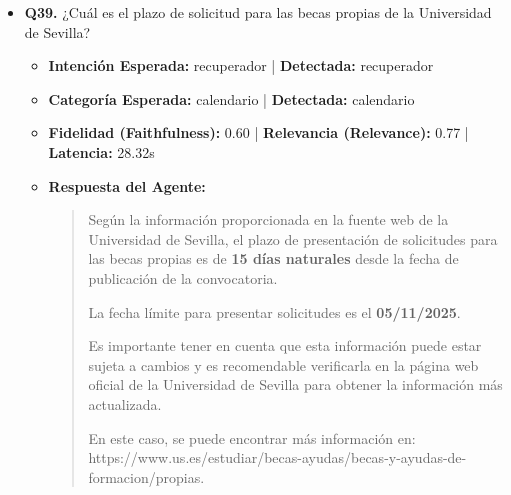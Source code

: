 \documentclass[12pt,a4paper,oneside]{report}
\begin{document}
\begin{itemize}
  
\item \textbf{Q39.} ¿Cuál es el plazo de solicitud para las becas propias de la Universidad de Sevilla? \\
        \begin{itemize}
          \item \textbf{Intención Esperada:} recuperador | \textbf{Detectada:} recuperador
          \item \textbf{Categoría Esperada:} calendario | \textbf{Detectada:} calendario
          \item \textbf{Fidelidad (Faithfulness):} 0.60 | \textbf{Relevancia (Relevance):} 0.77 | \textbf{Latencia:} 28.32s
          \item \textbf{{Respuesta del Agente:}} \\
                \begin{quote}
Según la información proporcionada en la fuente web de la Universidad de Sevilla, el plazo de presentación de solicitudes para las becas propias es de \textbf{15 días naturales} desde la fecha de publicación de la convocatoria.

La fecha límite para presentar solicitudes es el \textbf{05/11/2025}. 

Es importante tener en cuenta que esta información puede estar sujeta a cambios y es recomendable verificarla en la página web oficial de la Universidad de Sevilla para obtener la información más actualizada. 

En este caso, se puede encontrar más información en: https://www.us.es/estudiar/becas-ayudas/becas-y-ayudas-de-formacion/propias. 


\end{quote}
\end{itemize}
\end{itemize}
\end{document}
